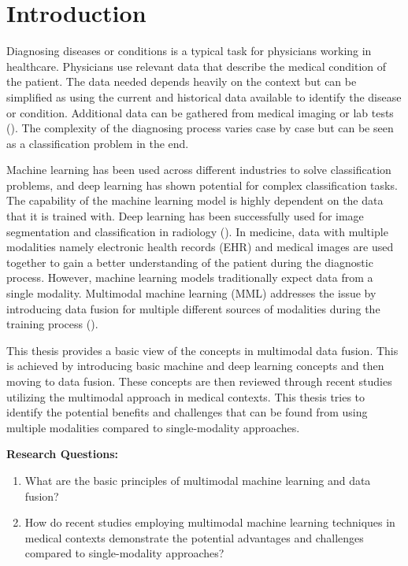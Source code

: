\chapter{Introduction\label{intro}}

Diagnosing diseases or conditions is a typical task for physicians working in healthcare. Physicians use relevant data that describe the medical condition of the patient. The data needed depends heavily on the context but can be simplified as using the current and historical data available to identify the disease or condition. Additional data can be gathered from medical imaging or lab tests (\cite{NAP21794}). The complexity of the diagnosing process varies case by case but can be seen as a classification problem in the end. 

Machine learning has been used across different industries to solve classification problems, and deep learning has shown potential for complex classification tasks. The capability of the machine learning model is highly dependent on the data that it is trained with. Deep learning has been successfully used for image segmentation and classification in radiology (\cite{lee2017deep}). In medicine, data with multiple modalities namely electronic health records (EHR) and medical images are used together to gain a better understanding of the patient during the diagnostic process. However, machine learning models traditionally expect data from a single modality. Multimodal machine learning (MML) addresses the issue by introducing data fusion for multiple different sources of modalities during the training process (\cite{8269806}).


This thesis provides a basic view of the concepts in multimodal data fusion. This is achieved by introducing basic machine and deep learning concepts and then moving to data fusion. These concepts are then reviewed through recent studies utilizing the multimodal approach in medical contexts. This thesis tries to identify the potential benefits and challenges that can be found from using multiple modalities compared to single-modality approaches. 

\bigskip

\textbf{Research Questions:}

\begin{enumerate}
    \item What are the basic principles of multimodal machine learning and data fusion?
    \item How do recent studies employing multimodal machine learning techniques in medical contexts demonstrate the potential advantages and challenges compared to single-modality approaches?
\end{enumerate}